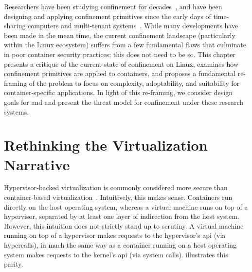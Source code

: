 Researchers have been studying confinement for decades~\cite{lampson1973_confinement}, and
have been designing and applying confinement primitives since the early days of
time-sharing computers and multi-tenant systems~\cite{shu2016_security_isolation_study}.
While many developments have been made in the mean time, the current confinement landscape
(particularly within the Linux ecosystem) suffers from a few fundamental flaws that
culminate in poor container security practices; this does not need to be so. This chapter
presents a critique of the current state of confinement on Linux, examines how confinement
primitives are applied to containers, and proposes a fundamental re-framing of the problem
to focus on complexity, adoptability, and suitability for container-specific applications.
In light of this re-framing, we consider design goals for \bpfbox{} and \bpfcontain{} and
present the threat model for confinement under these research systems.

\section{Rethinking the Virtualization Narrative}%
\label{s:cp-rethinking}

Hypervisor-backed virtualization is commonly considered more secure than
con\-tain\-er-based virtualization~\cite{sultan2019_container_security,
eder2016_hypervisor_container}.  Intuitively, this makes sense. Containers run directly on
the host operating system, whereas a virtual machine runs on top of a hypervisor,
separated by at least one layer of indirection from the host system. However, this
intuition does not strictly stand up to scrutiny. A virtual machine running on top of
a hypervisor makes requests to the hypervisor's \gls{api} (via hypercalls), in much the
same way as a container running on a host operating system makes requests to the kernel's
\gls{api} (via system calls).   illustrates this parity.

